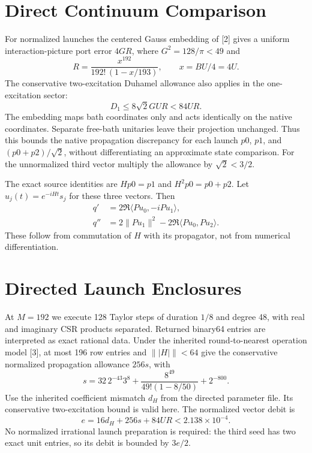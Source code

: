\documentclass[a4paper,journal]{IEEEtran}
\begin{document}
\section{Direct Continuum Comparison}
For normalized launches the centered Gauss embedding of [2] gives a uniform interaction-picture port error $4G R$, where $G^2=128/\pi<49$ and
\begin{equation}
 R=\frac{x^{192}}{192!\,(1-x/193)},\qquad x=BU/4=4U.
\end{equation}
The conservative two-excitation Duhamel allowance also applies in the one-excitation sector:
\begin{equation}
 D_1\le8\sqrt2 GUR<84UR.
\end{equation}
The embedding maps bath coordinates only and acts identically on the native coordinates. Separate free-bath unitaries leave their projection unchanged. Thus this bounds the native propagation discrepancy for each launch $p0$, $p1$, and $(p0+p2)/\sqrt2$, without differentiating an approximate state comparison. For the unnormalized third vector multiply the allowance by $\sqrt2<3/2$.

The exact source identities are $Hp0=p1$ and $H^2p0=p0+p2$. Let $u_j(t)=e^{-iHt}s_j$ for these three vectors. Then
\begin{align}
 q'&=2\Re\langle Pu_0,-iPu_1\rangle,\\
 q''&=2\|Pu_1\|^2-2\Re\langle Pu_0,Pu_2\rangle.
\end{align}
These follow from commutation of $H$ with its propagator, not from numerical differentiation.
\section{Directed Launch Enclosures}
At $M=192$ we execute 128 Taylor steps of duration $1/8$ and degree 48, with real and imaginary CSR products separated. Returned binary64 entries are interpreted as exact rational data. Under the inherited round-to-nearest operation model [3], at most 196 row entries and $\||H|\|<64$ give the conservative normalized propagation allowance $256s$, with
\begin{equation}
 s=32\,2^{-43}3^8+
 \frac{8^{49}}{49!(1-8/50)}+2^{-800}.
\end{equation}
Use the inherited coefficient mismatch $d_H$ from the directed parameter file. Its conservative two-excitation bound is valid here. The normalized vector debit is
\begin{equation}
 e=16d_H+256s+84UR<2.138\times10^{-4}.
\end{equation}
No normalized irrational launch preparation is required: the third seed has two exact unit entries, so its debit is bounded by $3e/2$.
\end{document}
